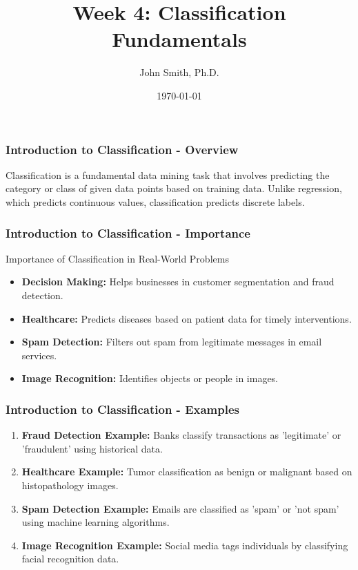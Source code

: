 \documentclass[aspectratio=169]{beamer}
\title[Classification Fundamentals]{Week 4: Classification Fundamentals}
\author[J. Smith]{John Smith, Ph.D.}
\institute[University Name]{
  Department of Computer Science\\
  University Name\\
  \vspace{0.3cm}
  Email: email@university.edu\\
  Website: www.university.edu
}
\date{\today}
\begin{document}
\frame{\titlepage}

\begin{frame}[fragile]
    \frametitle{Introduction to Classification - Overview}
    Classification is a fundamental data mining task that involves predicting the category or class of given data points based on training data. Unlike regression, which predicts continuous values, classification predicts discrete labels.
\end{frame}

\begin{frame}[fragile]
    \frametitle{Introduction to Classification - Importance}
    \begin{block}{Importance of Classification in Real-World Problems}
        \begin{itemize}
            \item \textbf{Decision Making:} Helps businesses in customer segmentation and fraud detection.
            \item \textbf{Healthcare:} Predicts diseases based on patient data for timely interventions.
            \item \textbf{Spam Detection:} Filters out spam from legitimate messages in email services.
            \item \textbf{Image Recognition:} Identifies objects or people in images.
        \end{itemize}
    \end{block}
\end{frame}

\begin{frame}[fragile]
    \frametitle{Introduction to Classification - Examples}
    \begin{enumerate}
        \item \textbf{Fraud Detection Example:} Banks classify transactions as 'legitimate' or 'fraudulent' using historical data.
        
        \item \textbf{Healthcare Example:} Tumor classification as benign or malignant based on histopathology images.
        
        \item \textbf{Spam Detection Example:} Emails are classified as 'spam' or 'not spam' using machine learning algorithms.
        
        \item \textbf{Image Recognition Example:} Social media tags individuals by classifying facial recognition data.
    \end{enumerate}
\end{frame}
\end{document}
